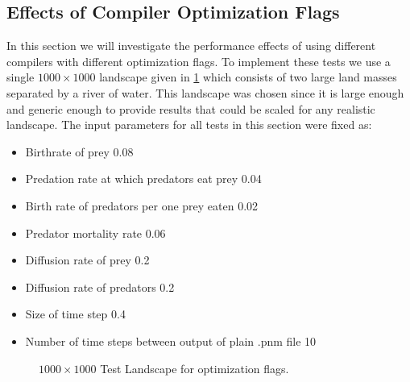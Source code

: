 \subsection{Effects of Compiler Optimization Flags}
\label{subsec:opflags}
In this section we will investigate the performance effects of using different compilers with different optimization flags. To implement these tests we use a single $1000\times1000$ landscape given in \ref{fig:OptLandscape} which consists of two large land masses separated by a river of water. This landscape was chosen since it is large enough and generic enough to provide results that could be scaled for any realistic landscape. The input parameters for all tests in this section were fixed as:
\begin{itemize}
	\item Birthrate of prey 0.08
	\item Predation rate at which predators eat prey 0.04
	\item Birth rate of predators per one prey eaten 0.02
	\item Predator mortality rate 0.06
	\item Diffusion rate of prey 0.2
	\item Diffusion rate of predators 0.2
	\item Size of time step 0.4
	\item Number of time steps between output of plain .pnm file 10
\end{itemize}
\begin{figure}
\label{fig:OptLandscape}
\centering
{}
\caption{ $1000\times1000$ Test Landscape for optimization flags.}
\end{figure}

